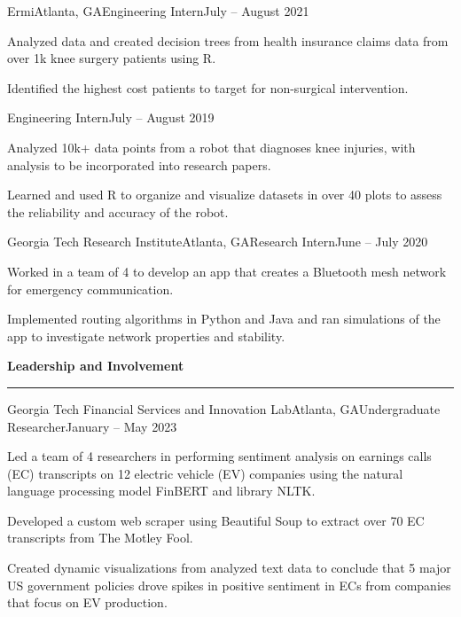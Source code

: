 \documentclass{article}
\newcommand{\horizontal}{\vspace{2pt}\hrule}
\newcommand{\sectitle}[1]{\vspace{2pt} \textbf{\large #1} \horizontal}
\begin{document}
\begin{flushleft}
    \begin{experience}{Ermi}{Atlanta, GA}{Engineering Intern}{July -- August 2021}
        \item Analyzed data and created decision trees from health insurance claims data from over 1k knee surgery patients using R.
        \item Identified the highest cost patients to target for non-surgical intervention.
    \end{experience}
    \begin{subexperience}{Engineering Intern}{July -- August 2019}
        \item Analyzed 10k+ data points from a robot that diagnoses knee injuries, with analysis to be incorporated into research papers.
        \item Learned and used R to organize and visualize datasets in over 40 plots to assess the reliability and accuracy of the robot.
    \end{subexperience}

    \begin{experience}{Georgia Tech Research Institute}{Atlanta, GA}{Research Intern}{June -- July 2020}
        \item Worked in a team of 4 to develop an app that creates a Bluetooth mesh network for emergency communication.
        \item Implemented routing algorithms in Python and Java and ran simulations of the app to investigate network properties and stability.
    \end{experience}

\sectitle{Leadership and Involvement}

    \begin{experience}{Georgia Tech Financial Services and Innovation Lab}{Atlanta, GA}{Undergraduate Researcher}{January -- May 2023}
        \item Led a team of 4 researchers in performing sentiment analysis on earnings calls (EC) transcripts on 12 electric vehicle (EV) companies using the natural language processing model FinBERT and library NLTK.
        \item Developed a custom web scraper using Beautiful Soup to extract over 70 EC transcripts from The Motley Fool.
        \item Created dynamic visualizations from analyzed text data to conclude that 5 major US government policies drove spikes in positive sentiment in ECs from companies that focus on EV production.
    \end{experience}


\end{flushleft}
\end{document}
